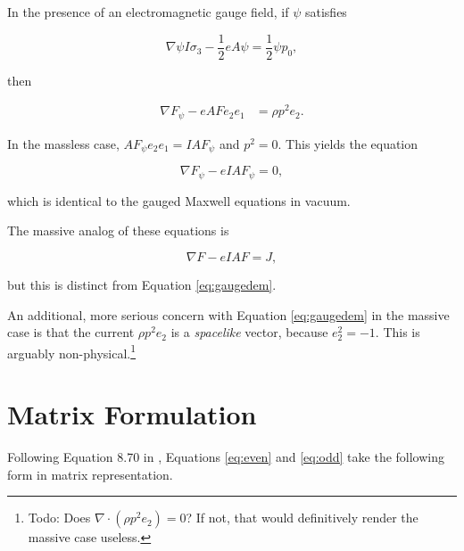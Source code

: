 \documentclass{article}
\begin{document}
    In the presence of an electromagnetic gauge field, if $\psi$ satisfies

    \begin{equation}
      \nabla \psi I \sigma_3 - \frac{1}{2} e A \psi = \frac{1}{2} \psi p_0,
    \end{equation}

    then

    \begin{align}
      \nabla F_\psi - e A F e_2 e_1
      &= \rho p^2 e_2.\label{eq:gaugedem}
    \end{align}

    In the massless case, $A F_\psi e_2 e_1 = I A F_\psi$ and $p^2 = 0$. This yields the equation 

    \begin{equation}
      \nabla F_\psi - e I A F_\psi = 0,
    \end{equation}

    which is identical to the gauged Maxwell equations in vacuum.\cite{duality}\cite{malik}\cite{tiwari}

    The massive analog of these equations is \cite{tiwari}

    \begin{equation}
      \nabla F - e I A F = J,
    \end{equation}

    but this is distinct from Equation \ref{eq:gaugedem}. 

    An additional, more serious concern with Equation \ref{eq:gaugedem} in the massive case is that the current $\rho p^2 e_2$ is a \emph{spacelike} vector, because $e_2^2 = -1$. This is arguably non-physical.\footnote{Todo: Does $\nabla \cdot (\rho p^2 e_2) = 0$? If not, that would definitively render the massive case useless.}



  \newpage

  \appendix

  \section{Matrix Formulation} \label{matrix}

  Following Equation 8.70 in \cite{gap}, Equations \ref{eq:even} and \ref{eq:odd} take the following form in matrix representation.
\end{document}
